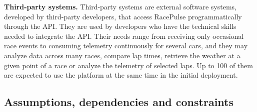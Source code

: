 \documentclass[11pt,a4paper]{article}
\newcommand{\RP}{RacePulse}
\begin{document}
\textbf{Third-party systems.} Third-party systems are external software systems, developed by third-party
developers, that access \RP{} programmatically through the API. They are used by developers who have the technical
skills needed to integrate the API. Their needs range from receiving only occasional race events to consuming
telemetry continuously for several cars, and they may analyze data across many races, compare lap times, retrieve
the weather at a given point of a race or analyze the telemetry of selected laps. Up to 100 of them are expected to
use the platform at the same time in the initial deployment.

\subsection{Assumptions, dependencies and constraints}
\end{document}
